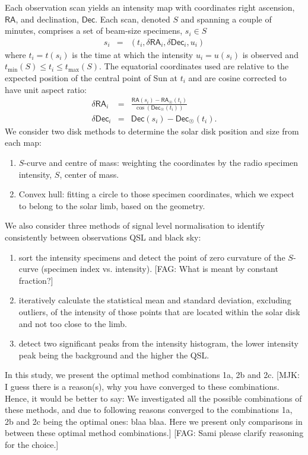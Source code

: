 \documentclass{aa}
\newcommand{\fag}[1]{\textcolor{midpurple}{[FAG: #1]}} %
\newcommand{\mjk}[1]{\textcolor{midgreen}{[MJK: #1]}} %
\newcommand{\eqnl}[2]{\begin{eqnarray}\label{#1}#2\end{eqnarray}}
\newcommand{\s}[2]{{#1}_{\mathrm{#2}}}
\newcommand{\RA}{{\mathsf{RA}}}
\newcommand{\Dec}{{\mathsf{Dec}}}
\newcommand{\dR}{{\mathsf{\delta RA}}}
\newcommand{\dD}{{\mathsf{\delta Dec}}}
\begin{document}
  Each observation scan yields an intensity map with coordinates right 
  ascension, $\RA$, and declination, $\Dec$.
  Each scan, denoted $S$ and spanning a couple of minutes, comprises a set of
  beam-size specimens, $s_i \in S$
  \eqnl{radio_sample}{
  s_i &=& 
  \left( t_i, \dR_i, \dD_i, u_i \right) %
  }
  where $t_i=t(s_i)$ is the time at which the intensity $u_i=u(s_i)$ is
  observed and 
  $\s{t}{min}(S) \le t_i \le \s{t}{max}(S)$.
  The equatorial coordinates used are relative to the expected position of
  the central point of Sun at $t_i$ and are cosine corrected to have unit
  aspect ratio:
  \eqnl{relative_radec}{
  \dR_i  &=& \frac{\RA(s_i) - \RA_{\astrosun}(t_i)}{\cos \left( \Dec_{\astrosun}(t_i) \right)} \\
  \dD_i &=& \Dec(s_i) - \Dec_{\astrosun}(t_i)\text{.}
  }
  We consider two disk methods to determine the solar disk position and size
  from each map:
  \begin{enumerate}
    \item $S$-curve and centre of mass: weighting the coordinates by the
    radio specimen intensity, $S$, center of mass.
    \item Convex hull: fitting a circle to those specimen coordinates, which
    we expect to belong to the solar limb, based on the geometry.
  \end{enumerate}
  We also consider three methods of signal level normalisation to identify
  consistently between observations QSL and black sky:
  \begin{enumerate}[a]
    \item  sort the intensity specimens and detect the point of zero curvature
    of the $S$-curve (specimen index vs. intensity).
    \fag{What is meant by constant fraction?}  
    \item iteratively calculate the statistical mean and standard deviation,
    excluding outliers, of the intensity of those points that are located
    within the solar disk and not too close to the limb.
    \item  detect two significant peaks from the intensity histogram,
    the lower intensity peak being the background and the higher the QSL.
  \end{enumerate}
  In this study, we present the optimal method combinations 1a, 2b and 2c.
  \mjk{I guess there is a reason(s), why you have converged to these combinations. Hence, it would be better to say: We investigated all the possible combinations of these methods, and due to following reasons converged to the combinations 1a, 2b and 2c being the optimal ones: blaa blaa. Here we present only comparisons in between these optimal method combinations.}
  \fag{Sami please clarify reasoning for the choice.}
\end{document}

